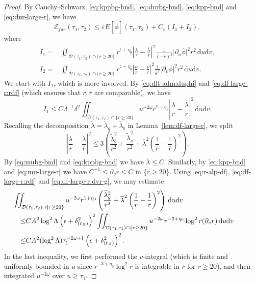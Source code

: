 \documentclass[10pt, reqno]{amsart}
\theoremstyle{definition}
\theoremstyle{remark}
\theoremstyle{conjecture}
\numberwithin{equation}{section}
\newcommand{\abs}[1]{\vert#1\vert}
\newcommand{\set}[1]{\{#1\}}
\newcommand{\ud}{\mathrm{d}}
\newcommand{\rd}{\partial}
\newcommand{\0}{\emptyset}
\newcommand{\dlt}{\delta}
\newcommand{\eps}{\epsilon}
\newcommand{\veps}{\varepsilon}
\newcommand{\kpp}{\kappa}
\newcommand{\lmb}{\lambda}
\newcommand{\Lmb}{\Lambda}
\newcommand{\omg}{\omega}
\newcommand{\calD}{\mathcal D}
\newcommand{\calE}{\mathcal E}
\newcommand{\dur}{\nu}
\newcommand{\dvr}{\lmb}
\newcommand{\phibg}{\overline{\phi}}				%
\newcommand{\dvrbg}{\overline{\dvr}}				%
\newcommand{\durbg}{\overline{\dur}}				%
\newcommand{\rbg}{\overline{r}}					%
\newcommand{\kppbg}{\overline{\kpp}}					%
\newcommand{\phidf}{\widetilde{\phi}}				%
\newcommand{\dvrdf}{\widetilde{\dvr}}				%
\newcommand{\Abs}[1]{\left\vert #1 \right\vert}
\begin{document}
\begin{proof}
By Cauchy--Schwarz, \eqref{eq:kppbg-bnd}, \eqref{eq:durbg-bnd}, \eqref{eq:kpp-bnd} and \eqref{eq:dur-large-r}, we have
\begin{equation} \label{eq:en-err-far:pf0}
	\calE_{far}(\tau_{1}, \tau_{2}) \leq \veps E[\phidf](\tau_{1}, \tau_{2}) + C_{\veps}(I_{1} + I_{2}),
\end{equation}
where
\begin{align*}
	I_{1} = & \iint_{\calD(\tau_{1}, \tau_{2}) \cap \set{r \geq 20}} r^{1+\eta_{0}} \Abs{\frac{\dvr}{r} - \frac{\dvrbg}{\rbg}}^{2} \frac{1}{(-\durbg)^{2}}\abs{\rd_{u} \phibg}^{2} r^{2} \, \ud u \ud v , \\
	I_{2} = & \iint_{\calD(\tau_{1}, \tau_{2}) \cap \set{r \geq 20}} r^{1+\eta_{0}} \Abs{\frac{\dur}{r} - \frac{\durbg}{\rbg}}^{2} \frac{1}{\kppbg^{2}}\abs{\rd_{v} \phibg}^{2} r^{2} \, \ud u \ud v .
\end{align*}
We start with $I_{1}$, which is more involved. By \eqref{eq:dlt-adm:duphi} and \eqref{eq:df-large-r:rdf} (which ensures that $r, \rbg$ are comparable), we have
\begin{equation} \label{eq:en-err-far:pf1}
	I_{1} \leq C \Lmb^{-1} \dlt^{2} \iint_{\calD(\tau_{1}, \tau_{2}) \cap \set{r \geq 20}} u^{-2\omg} r^{1+\eta_{0}} \Abs{\frac{\dvr}{r} - \frac{\dvrbg}{\rbg}}^{2} \, \ud u \ud v .
\end{equation}
Recalling the decomposition $\dvrdf = \dvrdf_{g} + \dvrdf_{b}$ in Lemma~\ref{lem:df-large-r}, we split
\begin{equation*}
\Abs{\frac{\dvr}{r} - \frac{\dvrbg}{\rbg}}^{2}
\leq 3 \left( \frac{\dvrdf_{b}^{2}}{r^{2}} + \frac{\dvrdf_{g}^{2}}{r^{2}} + \dvrbg^{2} \left(\frac{1}{r} - \frac{1}{\rbg} \right)^{2} \right).
\end{equation*}
By \eqref{eq:mubg-bnd} and \eqref{eq:kppbg-bnd} we have $\dvrbg \leq C$. Similarly, by \eqref{eq:kpp-bnd} and \eqref{eq:mu-large-r} we have $C^{-1} \leq \rd_v r \leq C$ in $\set{r \geq 20}$. Using \eqref{eq:r-alp-df}, \eqref{eq:df-large-r:rdf} and \eqref{eq:df-large-r:dvr-g}, we may estimate
\begin{equation} \label{eq:en-err-dvr-g}
\begin{aligned}
& \hskip-2em 
	\iint_{\calD(\tau_{1}, \tau_{2}) \cap \set{r \geq 20}} u^{-2\omg} r^{1+\eta_{0}} \left( \frac{\dvrdf_{g}^{2}}{r^{2}} + \dvrbg^{2} \left(\frac{1}{r} - \frac{1}{\rbg} \right)^{2} \right) \, \ud u \ud v  \\
	\leq & C A^{2} \log^{2} \Lmb \left( \eps + \dlt_{(t_{B})}^{2} \right)^{2} 
		\iint_{\calD(\tau_{1}, \tau_{2}) \cap \set{r \geq 20}} u^{-2\omg}  r^{-3+\eta_{0}} \log^2 r(\rd_{v} r) \, \ud u \ud v \\
	\leq & C A^{2} (\log^{2} \Lmb) \tau_{1}^{-2\omg + 1} \left( \eps + \dlt_{(t_{B})}^{2} \right)^{2} .
\end{aligned}
\end{equation}
In the last inequality, we first performed the $v$-integral (which is finite and uniformly bounded in $u$ since $r^{-3+\eta_{0}}\log^2 r$ is integrable in $r$ for $r \geq 20$), and then integrated $u^{-2 \omg}$ over $u \geq \tau_{1}$. 


\end{proof}
\end{document}
